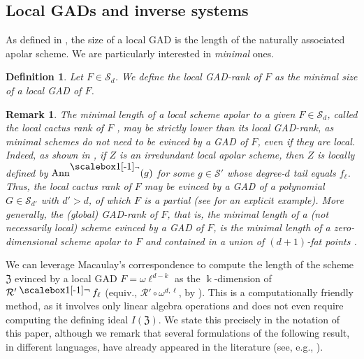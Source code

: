 \documentclass{amsart}
\theoremstyle{plain}
\newtheorem{definition}[definition]{Definition}
\newtheorem{remark}[remark]{Remark}
\renewcommand{\k}{\Bbbk}
\renewcommand{\S}{\mathcal{S}}
\newcommand{\Ann}{\textnormal{Ann}}
\newcommand{\contract}{\mathbin{\mathpalette\dointprod\relax}}
\newcommand{\dointprod}[2]{%
  \raisebox{\depth}{\scalebox{1}[-1]{$#1\lnot$}}}
\def\R{\mathcal{R}}
\def\Z{\mathfrak{Z}}
\def\Ann{\mathrm{Ann}}
\numberwithin{equation}{section}
\begin{document}
\subsection{Local GADs and inverse systems} As defined in , the size of a local GAD is the length of the naturally associated apolar scheme. We are particularly interested in \emph{minimal} ones.

\begin{definition}
    Let $F \in \S_d$.
    We define the \emph{local GAD-rank} of $F$ as the minimal size of a local GAD of $F$.
\end{definition}

\begin{remark} \label{rmk:localcactusvsGAD}
    The minimal length of a local scheme apolar to a given $F\in \S_d$, called the \emph{local cactus rank} of $F$ \cite{BJMR18}, may be strictly lower than its local GAD-rank, as minimal schemes do not need to be evinced by a GAD of $F$, even if they are local.
    Indeed, as shown in \cite[Prop. 1]{BJMR18}, if $Z$ is an \emph{irredundant} local apolar scheme, %
    then $Z$ is locally defined by $\Ann^{\contract}(g)$ for some $g \in \S'$ whose degree-$d$ tail equals $f_\ell$.
    Thus, the local cactus rank of $F$ may be evinced by a GAD of a polynomial $G\in \S_{d'}$ with $d'>d$, of which $F$ is a partial (see \cite[Example 4.6]{BOT24} for an explicit example). 
    More generally, the (global) GAD-rank of $F$, that is, the minimal length of a (not necessarily local) scheme evinced by a GAD of $F$, is the minimal length of a zero-dimensional scheme apolar to $F$ and contained in a union of $(d + 1)$-fat points \cite[Prop. 4.3]{BOT24}. 
\end{remark}

We can leverage Macaulay's correspondence \cite{M19} to compute the length of the scheme $\Z$ evinced by a local GAD $F = \omega \ell^{d-k}$ as the $\k$-dimension of $\R' \contract f_{\ell}$ (equiv., $\R' \circ \omega^{d,\ell}$, by ).
This is a computationally friendly method, as it involves only linear algebra operations and does not even require computing the defining ideal $I(\Z)$.
We state this precisely in the notation of this paper, although we remark that several formulations of the following result, in different languages, have already appeared in the literature (see, e.g., \cite{BJMR18,CI12,M18}).
\end{document}
